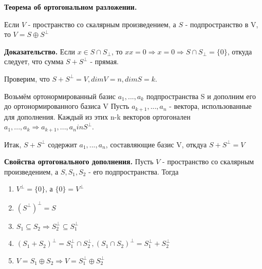 \documentclass[a4paper]{article}
\begin{document}
\newpage \begin{center}\begin{Large}\end{Large}\end{center}

\begin{htheorem}
\textbf{Теорема об ортогональном разложении.}

Если $V$ - пространство со скалярным произведением, а $S$ - подпространство в V, то $V = S \oplus S^{\bot}$
\end{htheorem}

\begin{hproof}
\textbf{Доказательство.} Если $x \in S \cap S_{\bot}$, то $xx=0 \Rightarrow x=0 \Rightarrow S \cap S_{\bot} = \{ 0 \}$, откуда следует, что сумма $S + S^{\bot}$ - прямая.

Проверим, что $S + S^{\bot} = V, dimV = n, dimS = k$.

Возьмём ортонормированный базис $a_1, ..., a_k$ подпространства S и дополним его до ортонормированного базиса V Пусть $a_{k+1}, ..., a_n$ - вектора, использованные для дополнения. Каждый из этих n-k векторов ортогонален $a_1, ..., a_k \Rightarrow a_{k+1}, ..., a_n in S^{\bot}$.

Итак,  $S + S^{\bot}$ содержит $a_1, ..., a_n$, составляющие базис V,  откдуа $S + S^{\bot} = V$
\end{hproof}


\begin{htheorem}
\textbf{Свойства ортогонального дополнения.} Пусть $V$ - пространство со скалярным произведением, а $S, S_1, S_2$ - его подпространства. Тогда 
\begin{enumerate}
\item $V^{\bot} = \{ 0 \}$, а $\{ 0 \} = V^{\bot}$
\item $(S^{\bot})^{\bot} = S$
\item $S_1 \subseteq S_2 \Rightarrow S_2^{\bot} \subseteq S_1^{\bot}$
\item $(S_1+S_2)^{\bot} = S_1^{\bot} \cap S_2^{\bot}, (S_1 \cap S_2)^{\bot} = S_1^{\bot} + S_2^{\bot}$
\item $V = S_1 \oplus S_2 \Rightarrow V = S_1^{\bot} \oplus S_2^{\bot}$
\end{enumerate}
\end{htheorem}
\end{document}
